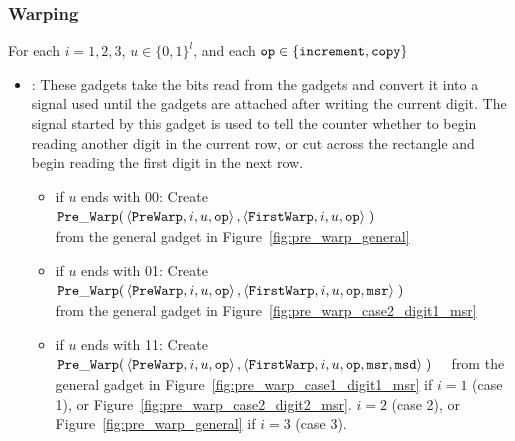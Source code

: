 
\subsubsection{ Warping }

    For each $i = 1, 2, 3$, $u \in \{0, 1\}^l$, and each ${\tt op} \in \{ {\tt increment, copy } \}$


    \begin{itemize}
        \item {\prewarp}: These gadgets take the bits read from the {\dreader} gadgets and convert it into
                          a signal used until the {\dtop} gadgets are attached after writing the current digit.
                          The signal started by this gadget is used to tell the counter whether to begin reading
                          another digit in the current row, or cut across the rectangle and begin reading the
                          first digit in the next row.


            \begin{itemize}

            \item if $u$ ends with 00:
            Create
            $\begin{aligned}[t]
                {\tt Pre\_Warp}(& \left\langle {\tt PreWarp},   i, u, {\tt op} \right\rangle,
                           \left\langle {\tt FirstWarp}, i, u, {\tt op} \right\rangle \;)
            \end{aligned}$ \\ from the general gadget in Figure~\ref{fig:pre_warp_general}

            \item if $u$ ends with 01:
            Create
            $\begin{aligned}[t]
                {\tt Pre\_Warp}(& \left\langle {\tt PreWarp},   i, u, {\tt op} \right\rangle,
                           \left\langle {\tt FirstWarp}, i, u, {\tt op}, {\tt msr} \right\rangle \;)
            \end{aligned}$ \\ from the general gadget in Figure~\ref{fig:pre_warp_case2_digit1_msr}

            \item if $u$ ends with 11:
            Create
            $\begin{aligned}[t]
                {\tt Pre\_Warp}(& \left\langle {\tt PreWarp},   i, u, {\tt op} \right\rangle,
                           \left\langle {\tt FirstWarp}, i, u, {\tt op}, {\tt msr}, {\tt msd} \right\rangle \;)
            \end{aligned}$ from the general gadget in Figure~\ref{fig:pre_warp_case1_digit1_msr} if $i = 1$ (case 1), or Figure~\ref{fig:pre_warp_case2_digit2_msr}.
            $i = 2$ (case 2), or Figure~\ref{fig:pre_warp_general} if $i = 3$ (case 3).
        \end{itemize}
        \vspace{.5cm}


\end{itemize}
